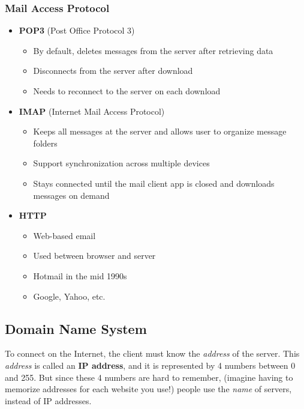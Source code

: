 \subsubsection{Mail Access Protocol}
\begin{itemize}
	\item \textbf{POP3} (Post Office Protocol 3)
	\begin{itemize}
		\item By default, deletes messages from the server after retrieving data
		\item Disconnects from the server after download 
		\item Needs to reconnect to the server on each download
	\end{itemize}
	\item \textbf{IMAP} (Internet Mail Access Protocol)
	\begin{itemize}
		\item Keeps all messages at the server and allows user to organize message folders
		\item Support synchronization across multiple devices
		\item Stays connected until the mail client app is closed and downloads messages on demand
	\end{itemize}
	\item \textbf{HTTP}
	\begin{itemize}
		\item Web-based email
		\item Used between browser and server
		\item Hotmail in the mid 1990s
		\item Google, Yahoo, etc.
	\end{itemize}
\end{itemize}

\subsection{Domain Name System}
To connect on the Internet, the client must know the \textit{address} of the server. This \textit{address} is called an \textbf{IP address}, and it is represented by 4 numbers between 0 and 255. But since these 4 numbers are hard to remember, (imagine having to memorize addresses for each website you use!) people use the \textit{name} of servers, instead of IP addresses.

